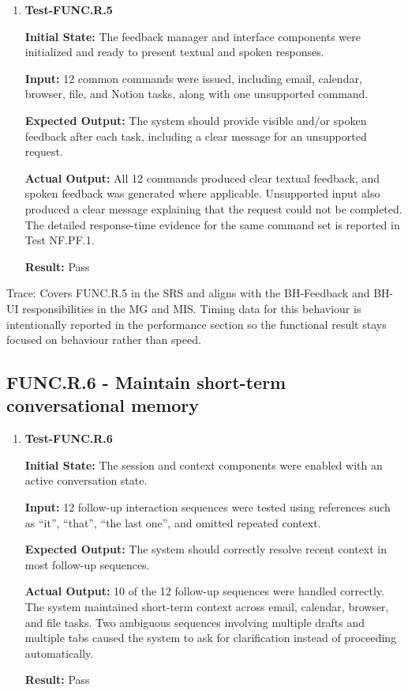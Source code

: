 \documentclass[12pt]{article}
\begin{document}
\begin{enumerate}
    \item \textbf{Test-FUNC.R.5}
    
    \textbf{Initial State:} The feedback manager and interface
    components were initialized and ready to present textual and spoken
    responses.
    
    \textbf{Input:} 12 common commands were issued, including email,
    calendar, browser, file, and Notion tasks, along with one
    unsupported command.
    
    \textbf{Expected Output:} The system should provide visible and/or
    spoken feedback after each task, including a clear message for an
    unsupported request.
    
    \textbf{Actual Output:} All 12 commands produced clear textual
    feedback, and spoken feedback was generated where applicable.
    Unsupported input also produced a clear message explaining that the
    request could not be completed. The detailed response-time evidence
    for the same command set is reported in Test NF.PF.1.
    
    \textbf{Result:} Pass
\end{enumerate}

\noindent Trace: Covers FUNC.R.5 in the SRS and aligns with the
BH-Feedback and BH-UI responsibilities in the MG and MIS. Timing data
for this behaviour is intentionally reported in the performance section
so the functional result stays focused on behaviour rather than speed.

\subsection{FUNC.R.6 - Maintain short-term conversational memory}

\begin{enumerate}
    \item \textbf{Test-FUNC.R.6}
    
    \textbf{Initial State:} The session and context components were
    enabled with an active conversation state.
    
    \textbf{Input:} 12 follow-up interaction sequences were tested
    using references such as ``it'', ``that'', ``the last one'', and
    omitted repeated context.
    
    \textbf{Expected Output:} The system should correctly resolve
    recent context in most follow-up sequences.
    
    \textbf{Actual Output:} 10 of the 12 follow-up sequences were
    handled correctly. The system maintained short-term context across
    email, calendar, browser, and file tasks. Two ambiguous sequences
    involving multiple drafts and multiple tabs caused the system to
    ask for clarification instead of proceeding automatically.
    
    \textbf{Result:} Pass
\end{enumerate}
\end{document}
